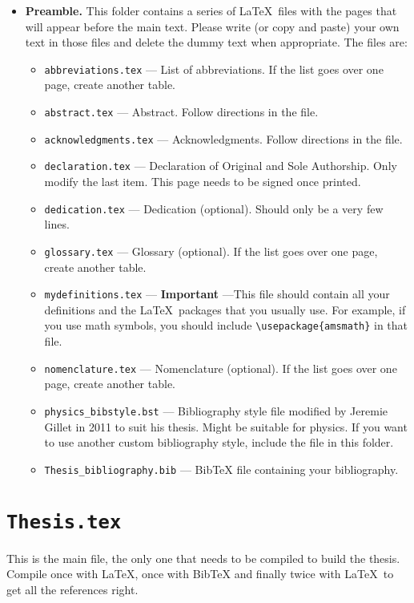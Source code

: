 \begin{itemize}
\item \textbf{Preamble.} This folder contains a series of \LaTeX\ files with the pages that will appear before the main text. Please write (or copy and paste) your own text in those files and delete the dummy text when appropriate. The files are:
\begin{itemize}
\item \texttt{abbreviations.tex} --- List of abbreviations. If the list goes over one page, create another table.
\item \texttt{abstract.tex} --- Abstract. Follow directions in the file.
\item \texttt{acknowledgments.tex} --- Acknowledgments. Follow directions in the file.
\item \texttt{declaration.tex} --- Declaration of Original and Sole Authorship. Only modify the last item. This page needs to be signed once printed.
\item \texttt{dedication.tex} --- Dedication (optional). Should only be a very few lines.
\item \texttt{glossary.tex} --- Glossary (optional). If the list goes over one page, create another table.
\item \texttt{mydefinitions.tex} --- \textbf{Important} ---This file should contain all your definitions and the \LaTeX\ packages that you usually use. For example, if you use math symbols, you should include \texttt{\textbackslash usepackage\{amsmath\}} in that file.
\item \texttt{nomenclature.tex} --- Nomenclature (optional). If the list goes over one page, create another table.
\item \texttt{physics\_bibstyle.bst} --- Bibliography style file modified by Jeremie Gillet in 2011 to suit his thesis. Might be suitable for physics. If you want to use another custom bibliography style, include the file in this folder.
\item \texttt{Thesis\_bibliography.bib} --- BibTeX file containing your bibliography.
\end{itemize}

\end{itemize}

\section{\texttt{Thesis.tex}}

This is the main file, the only one that needs to be compiled to build the thesis. Compile once with \LaTeX, once with BibTeX and finally twice with \LaTeX\ to get all the references right.

